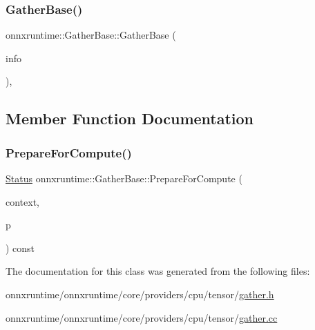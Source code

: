 \subsubsection{\texorpdfstring{Gather\+Base()}{GatherBase()}}
{\footnotesize\ttfamily onnxruntime\+::\+Gather\+Base\+::\+Gather\+Base (\begin{DoxyParamCaption}\item[{const \mbox{\hyperlink{classonnxruntime_1_1OpKernelInfo}{Op\+Kernel\+Info}} \&}]{info }\end{DoxyParamCaption})\hspace{0.3cm}{\ttfamily [inline]}, {\ttfamily [protected]}}



\subsection{Member Function Documentation}
\mbox{\label{classonnxruntime_1_1GatherBase_a57e2ca61085240839c3303300f31efd3}} 
\subsubsection{\texorpdfstring{Prepare\+For\+Compute()}{PrepareForCompute()}}
{\footnotesize\ttfamily \mbox{\hyperlink{classonnxruntime_1_1common_1_1Status}{Status}} onnxruntime\+::\+Gather\+Base\+::\+Prepare\+For\+Compute (\begin{DoxyParamCaption}\item[{\mbox{\hyperlink{classonnxruntime_1_1OpKernelContext}{Op\+Kernel\+Context}} $\ast$}]{context,  }\item[{\mbox{\hyperlink{structonnxruntime_1_1GatherBase_1_1Prepare}{Prepare}} \&}]{p }\end{DoxyParamCaption}) const\hspace{0.3cm}{\ttfamily [protected]}}



The documentation for this class was generated from the following files\+:\begin{DoxyCompactItemize}
\item 
onnxruntime/onnxruntime/core/providers/cpu/tensor/\mbox{\hyperlink{cpu_2tensor_2gather_8h}{gather.\+h}}\item 
onnxruntime/onnxruntime/core/providers/cpu/tensor/\mbox{\hyperlink{cpu_2tensor_2gather_8cc}{gather.\+cc}}\end{DoxyCompactItemize}
